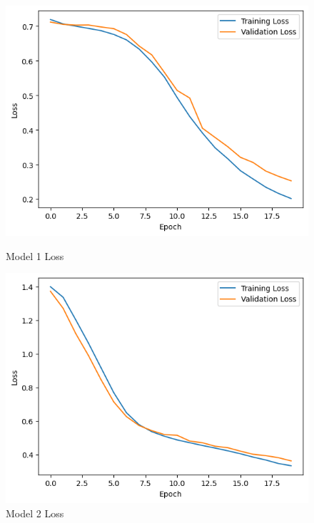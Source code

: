 \documentclass{article}
\begin{document}
\begin{figure}[h!]
    \centering
    \begin{minipage}{0.45\textwidth}
        \centering
        \includegraphics[width=1\textwidth]{graphs/tf_part1_loss.png} %
        \caption{Model 1 Loss}
    \end{minipage}\hfill
    \begin{minipage}{0.45\textwidth}
        \centering
        \includegraphics[width=1\textwidth]{graphs/tf_part2_loss.png} %
        \caption{Model 2 Loss}
    \end{minipage}
\end{figure}
\end{document}
